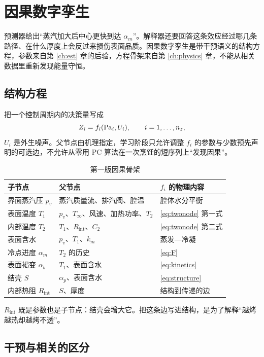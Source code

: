 \chapter{因果数字孪生}
\label{ch:causal}

预测器给出“蒸汽加大后中心更快到达 $\alpha_m$”。解释器还要回答这条效应经过哪几条路径、在什么厚度上会反过来损伤表面品质。因果数字孪生是带干预语义的结构方程，参数来自第 \ref{ch:est} 章的后验，方程骨架来自第 \ref{ch:physics} 章，不能从相关数据里重新发现能量守恒。

\section{结构方程}

把一个控制周期内的决策量写成
\begin{equation}
\label{eq:scm}
Z_i=f_i(\mathrm{Pa}_i,U_i),\qquad i=1,\ldots,n_z,
\end{equation}
$U_i$ 是外生噪声。父节点由机理指定，学习阶段只允许调整 $f_i$ 的参数与少数预先声明的可选边，不允许从零用 PC 算法在一次烹饪的短序列上“发现因果”。

\begin{table}[H]
\centering
\caption{第一版因果骨架}
\begin{tabularx}{\textwidth}{llX}
\toprule
子节点 & 父节点 & $f_i$ 的物理内容 \\
\midrule
界面蒸汽压 $p_v$ & 蒸汽质量流、排汽阀、腔温 & 腔体水分平衡 \\
表面温度 $T_1$ & $p_v$、$T_\infty$、风速、加热功率、$T_2$ & \eqref{eq:twonode} 第一式 \\
内部温度 $T_2$ & $T_1$、$R_{\mathrm{int}}$、$C_2$ & \eqref{eq:twonode} 第二式 \\
表面含水 & $p_v$、$T_1$、$k_m$ & 蒸发—冷凝 \\
冷点进度 $\alpha_m$ & $T_2$ 的历史 & \eqref{eq:F} \\
表面褐变 $\alpha_b$ & $T_1$、表面含水 & \eqref{eq:kinetics} \\
结壳 $S$ & $\alpha_p$、表面含水 & \eqref{eq:structure} \\
内部热阻 $R_{\mathrm{int}}$ & $S$、厚度 & 结构到传递的边 \\
\bottomrule
\end{tabularx}
\end{table}

$R_{\mathrm{int}}$ 既是参数也是子节点：结壳会增大它。把这条边写进结构，是为了解释“越烤越热却越烤不透”。

\section{干预与相关的区分}

